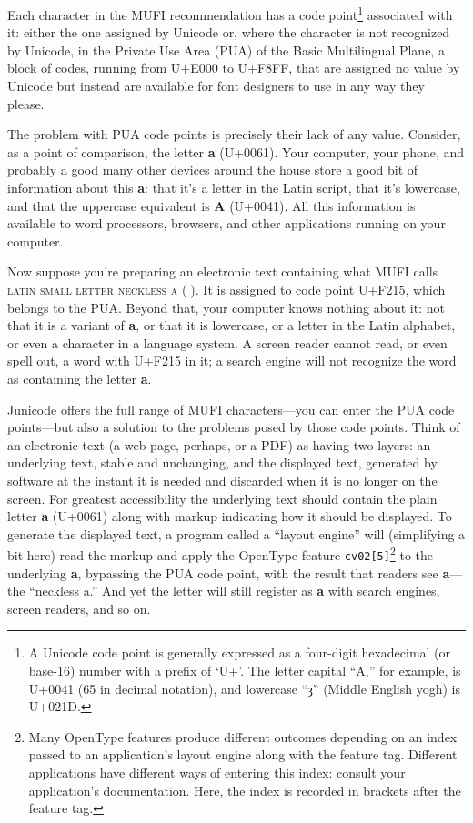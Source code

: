 \documentclass[letterpaper,12pt]{article}
\newcommand\textstyleletterexample[1]{\textrm{\textbf{#1}}}
\newcommand\textstyleUName[1]{\textsc{#1}}
\newcommand\textstyleSourceText[1]{\texttt{#1}}
\newcommand{\cvd}[3][0]{{\addfontfeature{CharacterVariant=#2:#1}#3}}
\begin{document}
Each character in the MUFI recommendation has a code point\footnote{A Unicode code point is generally expressed as a
four-digit hexadecimal (or base-16) number with a prefix of `U+'. The letter capital ``A,'' for example, is U+0041 (65
in decimal notation), and lowercase ``ȝ'' (Middle English yogh) is U+021D.} associated with it: either the one
assigned by Unicode or, where the character is not recognized by Unicode, in the Private Use Area (PUA) of the Basic
Multilingual Plane, a block of codes, running from U+E000 to U+F8FF, that are assigned no value by Unicode but instead
are available for font designers to use in any way they please.

The problem with PUA code points is precisely their lack of any value. Consider, as a point of comparison, the letter
\textstyleletterexample{a} (U+0061). Your computer, your phone, and probably a good many other devices around the house
store a good bit of information about this \textstyleletterexample{a}: that it's a letter in the Latin script, that
it's lowercase, and that the uppercase equivalent is \textstyleletterexample{A} (U+0041). All this information is
available to word processors, browsers, and other applications running on your computer.

Now suppose you're preparing an electronic text containing what MUFI calls \textstyleUName{latin small letter neckless
a} (\textstyleletterexample{}). It is assigned to code point U+F215, which belongs to the PUA. Beyond that, your
computer knows nothing about it: not that it is a variant of \textstyleletterexample{a}, or that it is lowercase, or a letter in the Latin
alphabet, or even a character in a language system. A screen reader cannot read, or even spell out, a word with U+F215
in it; a search engine will not recognize the word as containing the letter \textstyleletterexample{a}.

Junicode offers the full range of MUFI characters---you can enter the PUA code points---but also a solution to the
problems posed by those code points. Think of an electronic text (a web page, perhaps, or a PDF) as having two layers:
an underlying text, stable and unchanging, and the displayed text, generated by software at the instant it is needed
and discarded when it is no longer on the screen. For greatest accessibility the underlying text should contain the
plain letter \textstyleletterexample{a} (U+0061) along with markup indicating how it should be displayed. To generate
the displayed text, a program called a ``layout engine'' will (simplifying a bit here) read the markup and apply the
OpenType feature \textstyleSourceText{cv02[5]}\footnote{Many OpenType features produce different outcomes depending on
an index passed to an application's layout engine along with the feature tag. Different applications have different
ways of entering this index: consult your application's documentation. Here, the index is recorded in brackets after
the feature tag.\par } to the underlying \textstyleletterexample{a}, bypassing the PUA code point, with the result that
readers see \textstyleletterexample{\cvd[4]{2}{a}}{}---the ``neckless a.'' And yet the letter will still register as
\textstyleletterexample{a} with search engines, screen readers, and so on.
\end{document}
